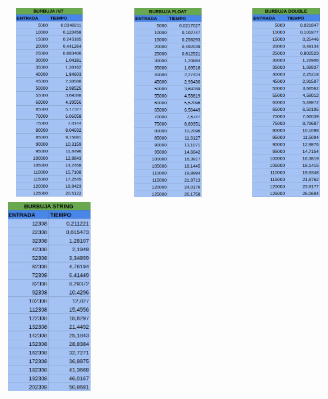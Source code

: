 \documentclass[11pt]{article}
\begin{document}
\begin{figure}[H]
    \begin{minipage}{0.5\textwidth}
        \centering
        \includegraphics[width=3cm, height=5cm]{assets/Img/burbujatabla1.png}

    \end{minipage}%
    \begin{minipage}{0.5\textwidth}
        \centering
        \includegraphics[width=3cm, height=5cm]{assets/Img/burbujatabla2.png}

    \end{minipage}
    \begin{minipage}{0.5\textwidth}
        \centering
        \includegraphics[width=3cm, height=5cm]{assets/Img/burbujatabla3.png}

    \end{minipage}
    \begin{minipage}{0.5\textwidth}
        \centering
        \includegraphics[width=3cm, height=5cm]{assets/Img/burbujatabla4.png}
    \end{minipage}
\end{figure}
\end{document}
